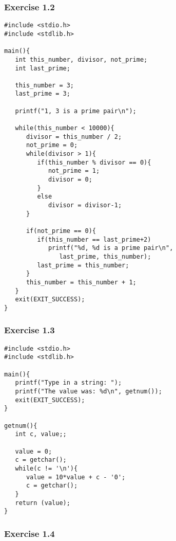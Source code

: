   

  \subsubsection*{Exercise 1.2}

   \begin{Verbatim}
#include <stdio.h>
#include <stdlib.h>

main(){
   int this_number, divisor, not_prime;
   int last_prime;

   this_number = 3;
   last_prime = 3;

   printf("1, 3 is a prime pair\n");

   while(this_number < 10000){
      divisor = this_number / 2;
      not_prime = 0;
      while(divisor > 1){
         if(this_number % divisor == 0){
            not_prime = 1;
            divisor = 0;
         }
         else
            divisor = divisor-1;
      }

      if(not_prime == 0){
         if(this_number == last_prime+2)
            printf("%d, %d is a prime pair\n",
               last_prime, this_number);
         last_prime = this_number;
      }
      this_number = this_number + 1;
   }
   exit(EXIT_SUCCESS);
}
\end{Verbatim}

  

  \subsubsection*{Exercise 1.3}

   \begin{Verbatim}
#include <stdio.h>
#include <stdlib.h>

main(){
   printf("Type in a string: ");
   printf("The value was: %d\n", getnum());
   exit(EXIT_SUCCESS);
}

getnum(){
   int c, value;;

   value = 0;
   c = getchar();
   while(c != '\n'){
      value = 10*value + c - '0';
      c = getchar();
   }
   return (value);
}
\end{Verbatim}

  

  \subsubsection*{Exercise 1.4}

